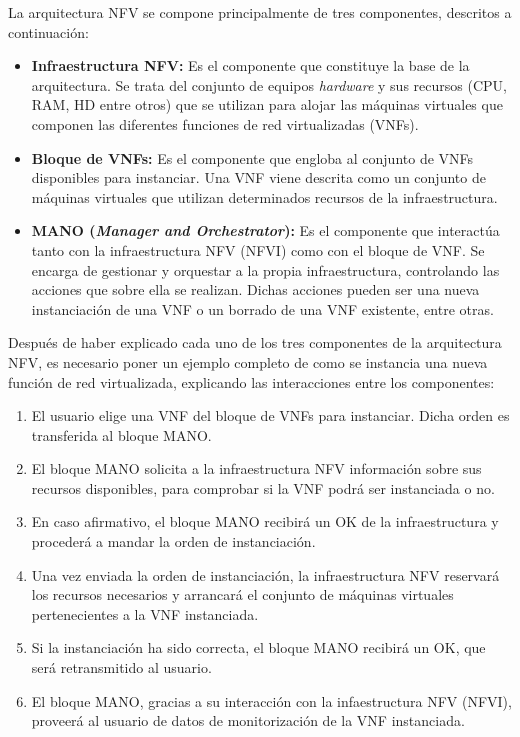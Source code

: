 La arquitectura \ac{NFV} se compone principalmente de tres componentes, descritos a continuación:

\begin{itemize}
	\item \textbf{Infraestructura \ac{NFV}:} Es el componente que constituye la base de la arquitectura. Se trata del conjunto de equipos \textit{hardware} y sus recursos (CPU, RAM, HD entre otros) que se utilizan para alojar las máquinas virtuales que componen las diferentes funciones de red virtualizadas (\acp{VNF}).
	
	\item \textbf{Bloque de VNFs:} Es el componente que engloba al conjunto de \acp{VNF} disponibles para instanciar. Una \ac{VNF} viene descrita como un conjunto de máquinas virtuales que utilizan determinados recursos de la infraestructura.
	
	\item \textbf{MANO (\textit{Manager and Orchestrator}):} Es el componente que interactúa tanto con la infraestructura \ac{NFV} (\ac{NFVI}) como con el bloque de \ac{VNF}. Se encarga de gestionar y orquestar a la propia infraestructura, controlando las acciones que sobre ella se realizan. Dichas acciones pueden ser una nueva instanciación de una \ac{VNF} o un borrado de una \ac{VNF} existente, entre otras.
	
\end{itemize}

Después de haber explicado cada uno de los tres componentes de la arquitectura \ac{NFV}, es necesario poner un ejemplo completo de como se instancia una nueva función de red virtualizada, explicando las interacciones entre los componentes:

\begin{enumerate}
	\item El usuario elige una \ac{VNF} del bloque de \acp{VNF} para instanciar. Dicha orden es transferida al bloque \ac{MANO}.
	\item El bloque \ac{MANO} solicita a la infraestructura \ac{NFV} información sobre sus recursos disponibles, para comprobar si la \ac{VNF} podrá ser instanciada o no.
	\item En caso afirmativo, el bloque MANO recibirá un OK de la infraestructura y procederá a mandar la orden de instanciación.
	\item Una vez enviada la orden de instanciación, la infraestructura \ac{NFV} reservará los recursos necesarios y arrancará el conjunto de máquinas virtuales pertenecientes a la \ac{VNF} instanciada.
	\item Si la instanciación ha sido correcta, el bloque MANO recibirá un OK, que será retransmitido al usuario.
	\item El bloque \ac{MANO}, gracias a su interacción con la infaestructura \ac{NFV} (\ac{NFVI}), proveerá al usuario de datos de monitorización de la \ac{VNF} instanciada.
\end{enumerate}


